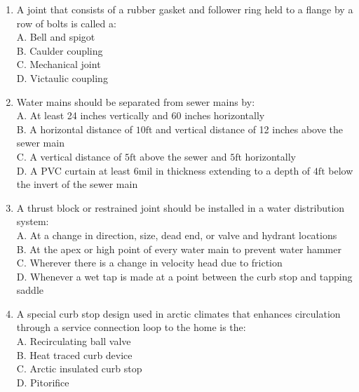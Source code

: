 \documentclass[10pt]{article}
\begin{document}
\begin{enumerate}
  \item A joint that consists of a rubber gasket and follower ring held to a flange by a row of bolts is called a:\\
A. Bell and spigot\\
B. Caulder coupling\\
C. Mechanical joint\\
D. Victaulic coupling

  \item Water mains should be separated from sewer mains by:\\
A. At least 24 inches vertically and 60 inches horizontally\\
B. A horizontal distance of $10 \mathrm{ft}$ and vertical distance of 12 inches above the sewer main\\
C. A vertical distance of $5 \mathrm{ft}$ above the sewer and $5 \mathrm{ft}$ horizontally\\
D. A PVC curtain at least $6 \mathrm{mil}$ in thickness extending to a depth of $4 \mathrm{ft}$ below the invert of the sewer main

  \item A thrust block or restrained joint should be installed in a water distribution system:\\
A. At a change in direction, size, dead end, or valve and hydrant locations\\
B. At the apex or high point of every water main to prevent water hammer\\
C. Wherever there is a change in velocity head due to friction\\
D. Whenever a wet tap is made at a point between the curb stop and tapping saddle

  \item A special curb stop design used in arctic climates that enhances circulation through a service connection loop to the home is the:\\
A. Recirculating ball valve\\
B. Heat traced curb device\\
C. Arctic insulated curb stop\\
D. Pitorifice

\end{enumerate}
\end{document}
